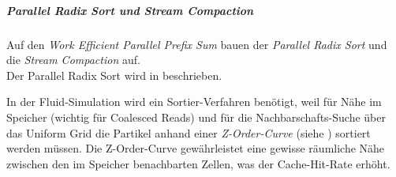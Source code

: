 		
		
		\subparagraph{Parallel Radix Sort und Stream Compaction}
		Auf den \emph{Work Efficient Parallel Prefix Sum} bauen der 
		\emph{Parallel Radix Sort} und die \emph{Stream Compaction} auf.\\
		Der Parallel Radix Sort wird in \cite{Grand2008} beschrieben.

		In der Fluid-Simulation wird ein Sortier-Verfahren benötigt, weil
		für Nähe im Speicher (wichtig für Coalesced Reads) und für die Nachbarschafts-Suche 
		über das Uniform Grid die Partikel anhand einer \emph{Z-Order-Curve} (siehe \cite{wiki:ZCurve}) sortiert werden 
		müssen.
		Die Z-Order-Curve gewährleistet eine gewisse räumliche Nähe zwischen den im Speicher benachbarten Zellen,
		was der Cache-Hit-Rate erhöht.
		
